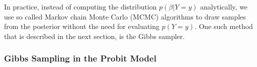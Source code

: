 In practice, instead of computing the distribution $p(\beta|Y=y)$
analytically, we use so called Markov chain Monte Carlo (MCMC)
algorithms to draw samples from the posterior without the
need for evaluating $p(Y=y)$. One such method that is described
in the next section, is the Gibbs sampler.

\subsubsection{Gibbs Sampling in the Probit Model}

\newpage